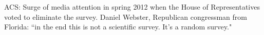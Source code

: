 \documentclass[11pt,containsverbatim,handout,xcolor=xelatex,dvipsnames,table]{beamer}
\begin{document}

\begin{frame}

\vfill

ACS: Surge of media attention in spring 2012 when the House of Representatives voted to eliminate the survey. Daniel Webster, Republican congressman from Florida: ``in the end this is not a scientific survey. It's a random survey."

\vfill

\end{frame}


\begin{frame}

\vfill


\vfill

\end{frame}

\end{document}
